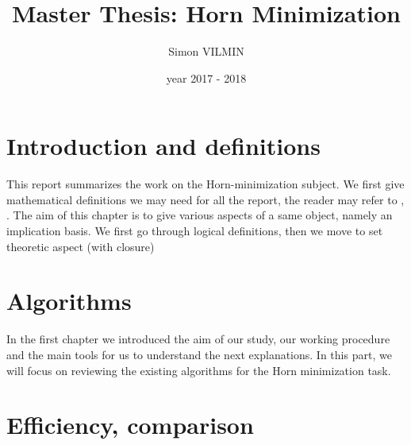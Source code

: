 \documentclass[a4paper]{report}
\title{Master Thesis: Horn Minimization}
\author{Simon VILMIN}
\date{year 2017 - 2018}
\begin{document}
\maketitle
\tableofcontents

\chapter{Introduction and definitions}

This report summarizes the work on the Horn-minimization subject. We first give
mathematical definitions we may need for all the report, the reader may refer 
to \cite{Lat&Ord}, \cite{CExp}. The aim of this chapter is to give various 
aspects of a same object, namely an implication basis. We first go through 
logical definitions, then we move to set theoretic aspect (with closure) 














\chapter{Algorithms}

In the first chapter we introduced the aim of our study, our working procedure
and the main tools for us to understand the next explanations. In this part, we
will focus on reviewing the existing algorithms for the Horn minimization task. 



















\chapter{Efficiency, comparison}




	
\end{document}
